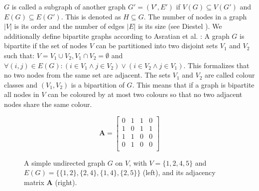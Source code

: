 $G$ is called a subgraph of another graph $G'=(V',E')$ if $V(G) \subseteq V(G')$ and $E(G) \subseteq E(G')$. This is denoted as $H \subseteq G$. The number of nodes in a graph $|V|$ is its order and the number of edges $|E|$ is its size (see Diestel \cite{Diestel2017}).
We additionally define bipartite graphs according to Asratian et al. \cite{asratian1998}: A graph $G$ is bipartite if the set of nodes $V$ can be partitioned into two disjoint sets $V_1$ and $V_2$ such that: $V = V_1 \cup V_2, V_1 \cap V_2 = \emptyset$ and $\forall (i,j) \in E(G): (i \in V_1 \land j \in V_2) \lor (i \in V_2 \land j \in V_1)$. This formalizes that no two nodes from the same set are adjacent. The sets $V_1$ and $V_2$ are called colour classes and $(V_1, V_2)$ is a bipartition of $G$. This means that if a graph is bipartite all nodes in $V$ can be coloured by at most two colours so that no two adjacent nodes share the same colour.\\
\begin{figure}[h]
    \centering
    \begin{minipage}{0.5\textwidth}
        \centering
    \end{minipage}%
    \begin{minipage}{0.45\textwidth}
        \vspace*{0.1cm} %
        \[
        \mathbf{A} = \begin{bmatrix}
            0 & 1 & 1 & 0 \\
            1 & 0 & 1 & 1 \\
            1 & 1 & 0 & 0 \\
            0 & 1 & 0 & 0 \\
        \end{bmatrix}
        \]
    \end{minipage}
    \caption{A simple undirected graph $G$ on $V$, with $V=\{1,2,4,5\}$ and $E(G)=\{\{1,2\},\{2,4\},\{1,4\},\{2,5\}\}$ (left), and its adjacency matrix $\mathbf{A}$ (right).}
    \label{fig:graph-example}
\end{figure}

